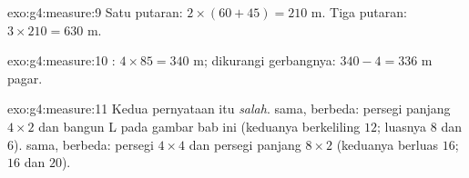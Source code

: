 \begin{solution}{exo:g4:measure:9}
Satu putaran: $2 \times (60 + 45) = 210$ m. Tiga putaran:
$3 \times 210 = 630$ m.
\end{solution}

\begin{solution}{exo:g4:measure:10}
: $4 \times 85 = 340$ m; dikurangi gerbangnya:
$340 - 4 = 336$ m pagar.
\end{solution}

\begin{solution}{exo:g4:measure:11}
Kedua pernyataan itu \emph{salah}.  sama,  berbeda:
persegi panjang $4 \times 2$ dan bangun L pada gambar bab ini
(keduanya berkeliling $12$; luasnya $8$ dan $6$).  sama,
 berbeda: persegi $4 \times 4$ dan persegi panjang
$8 \times 2$ (keduanya berluas $16$;  $16$ dan $20$).

\end{solution}
